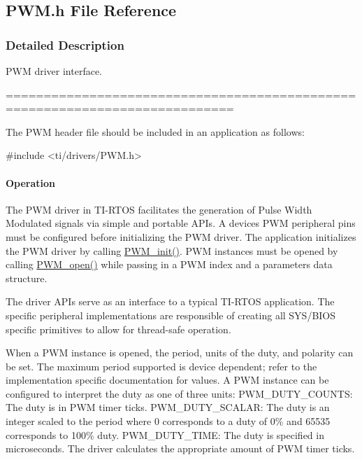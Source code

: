 \subsection{P\+W\+M.\+h File Reference}
\label{_p_w_m_8h}


\subsubsection{Detailed Description}
P\+W\+M driver interface. 

============================================================================

The P\+W\+M header file should be included in an application as follows\+: 
\begin{DoxyCode}
\textcolor{preprocessor}{#include <ti/drivers/PWM.h>}
\end{DoxyCode}


\paragraph*{Operation}

The P\+W\+M driver in T\+I-\/\+R\+T\+O\+S facilitates the generation of Pulse Width Modulated signals via simple and portable A\+P\+Is. A device\textquotesingle{}s P\+W\+M peripheral pins must be configured before initializing the P\+W\+M driver. The application initializes the P\+W\+M driver by calling \hyperlink{_p_w_m_8h_aadae3fe77e36cbf9643a22eeb99fb01e}{P\+W\+M\+\_\+init()}. P\+W\+M instances must be opened by calling \hyperlink{_p_w_m_8h_ac963beab0c5c6901bf852f175028aeaf}{P\+W\+M\+\_\+open()} while passing in a P\+W\+M index and a parameters data structure.

The driver A\+P\+Is serve as an interface to a typical T\+I-\/\+R\+T\+O\+S application. The specific peripheral implementations are responsible of creating all S\+Y\+S/\+B\+I\+O\+S specific primitives to allow for thread-\/safe operation.

When a P\+W\+M instance is opened, the period, units of the duty, and polarity can be set. The maximum period supported is device dependent; refer to the implementation specific documentation for values. A P\+W\+M instance can be configured to interpret the duty as one of three units\+: P\+W\+M\+\_\+\+D\+U\+T\+Y\+\_\+\+C\+O\+U\+N\+T\+S\+: The duty is in P\+W\+M timer ticks. P\+W\+M\+\_\+\+D\+U\+T\+Y\+\_\+\+S\+C\+A\+L\+A\+R\+: The duty is an integer scaled to the period where 0 corresponds to a duty of 0\% and 65535 corresponds to 100\% duty. P\+W\+M\+\_\+\+D\+U\+T\+Y\+\_\+\+T\+I\+M\+E\+: The duty is specified in microseconds. The driver calculates the appropriate amount of P\+W\+M timer ticks.

